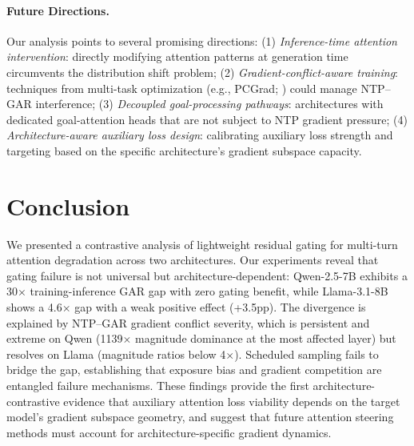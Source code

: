 \documentclass[11pt,a4paper]{article}
\begin{document}
\paragraph{Future Directions.}
Our analysis points to several promising directions:
(1) \emph{Inference-time attention intervention}: directly modifying attention patterns at generation time circumvents the distribution shift problem;
(2) \emph{Gradient-conflict-aware training}: techniques from multi-task optimization (e.g., PCGrad; \citealp{yu2020gradient}) could manage NTP--GAR interference;
(3) \emph{Decoupled goal-processing pathways}: architectures with dedicated goal-attention heads that are not subject to NTP gradient pressure;
(4) \emph{Architecture-aware auxiliary loss design}: calibrating auxiliary loss strength and targeting based on the specific architecture's gradient subspace capacity.

\section{Conclusion}
\label{sec:conclusion}

We presented a contrastive analysis of lightweight residual gating for multi-turn attention degradation across two architectures.
Our experiments reveal that gating failure is not universal but architecture-dependent: Qwen-2.5-7B exhibits a 30$\times$ training-inference GAR gap with zero gating benefit, while Llama-3.1-8B shows a 4.6$\times$ gap with a weak positive effect (+3.5pp).
The divergence is explained by NTP--GAR gradient conflict severity, which is persistent and extreme on Qwen (1139$\times$ magnitude dominance at the most affected layer) but resolves on Llama (magnitude ratios below 4$\times$).
Scheduled sampling fails to bridge the gap, establishing that exposure bias and gradient competition are entangled failure mechanisms.
These findings provide the first architecture-contrastive evidence that auxiliary attention loss viability depends on the target model's gradient subspace geometry, and suggest that future attention steering methods must account for architecture-specific gradient dynamics.
\end{document}
